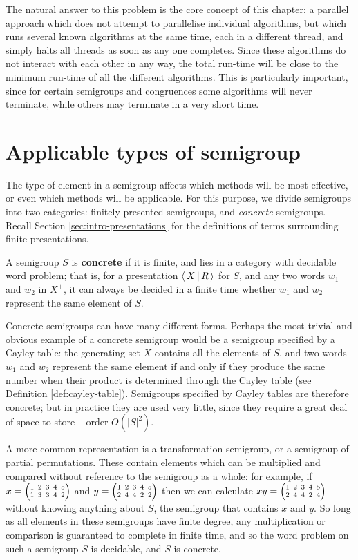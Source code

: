 The natural answer to this problem is the core concept of this chapter: a
parallel approach which does not attempt to parallelise individual algorithms,
but which runs several known algorithms at the same time, each in a different
thread, and simply halts all threads as soon as any one completes.  Since these
algorithms do not interact with each other in any way, the total run-time will
be close to the minimum run-time of all the different algorithms.  This is
particularly important, since for certain semigroups and congruences some
algorithms will never terminate, while others may terminate in a very short
time.

\section{Applicable types of semigroup}
\label{sec:applicable-types-of-semigroup}

The type of element in a semigroup affects which methods will be most effective,
or even which methods will be applicable.  For this purpose, we divide
semigroups into two categories: finitely presented semigroups, and
\textit{concrete} semigroups.  Recall Section \ref{sec:intro-presentations} for
the definitions of terms surrounding finite presentations.

\begin{definition}
  \label{def:concrete}
  A semigroup $S$ is \textbf{concrete} if it is finite, and lies in a category
  with decidable word problem; that is, for a presentation $\left\langle\,X\,\middle|\,R\,\right\rangle$ for $S$, and
  any two words $w_1$ and $w_2$ in $X^+$, it can always be decided in a finite
  time whether $w_1$ and $w_2$ represent the same element of $S$.
\end{definition}

Concrete semigroups can have many different forms.  Perhaps the most trivial and
obvious example of a concrete semigroup would be a semigroup specified by a
Cayley table: the generating set $X$ contains all the elements of $S$, and two
words $w_1$ and $w_2$ represent the same element if and only if they produce the
same number when their product is determined through the Cayley table (see
Definition \ref{def:cayley-table}).  Semigroups specified by
Cayley tables are therefore concrete; but in practice they are used very little,
since they require a great deal of space to store -- order $O(|S|^2)$.

A more common representation is a transformation semigroup, or a semigroup of
partial permutations.  These contain elements which can be multiplied and
compared without reference to the semigroup as a whole: for example, if
$x = \transV 13342$ and $y = \transV 24422$ then we can calculate
$xy = \transV 24424$ without knowing anything about $S$, the semigroup that
contains $x$ and $y$.  So long as all elements in these semigroups have finite
degree, any multiplication or comparison is guaranteed to complete in finite
time, and so the word problem on such a semigroup $S$ is decidable, and $S$ is
concrete.

